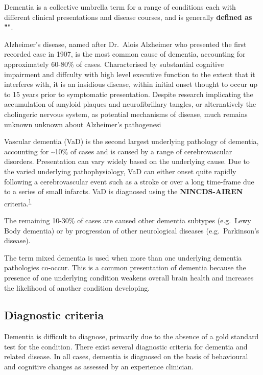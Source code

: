 \documentclass[a4paper, twoside]{templates/ociamthesis}
\begin{document}
Dementia is a collective umbrella term for a range of conditions each with different clinical presentations and disease courses, and is generally \textbf{defined as ""}.

Alzheimer's disease, named after Dr.~Alois Alzheimer who presented the first recorded case in 1907, is the most common cause of dementia, accounting for approximately 60-80\% of cases. Characterised by substantial cognitive impairment and diffculty with high level executive function to the extent that it interferes with, it is an insidious disease, within initial onset thought to occur up to 15 years prior to symptomatic presentation. Despite research implicating the accumulation of amyloid plaques and neurofibrillary tangles, or alternatively the cholingeric nervous system, as potential mechanisms of disease, much remains unknown unknown about Alzheimer's pathogenesi

Vascular dementia (VaD) is the second largest underlying pathology of dementia, accounting for \textasciitilde10\% of cases and is caused by a range of cerebrovascular disorders. Presentation can vary widely based on the underlying cause. Due to the varied underlying pathophysiology, VaD can either onset quite rapidly following a cerebrovascular event such as a stroke or over a long time-frame due to a series of small infarcts. VaD is diagnosed using the \textbf{NINCDS-AIREN} criteria.\textsuperscript{\protect\hyperlink{ref-roman1993vascular}{1}}

The remaining 10-30\% of cases are caused other dementia subtypes (e.g.~Lewy Body dementia) or by progression of other neurological diseases (e.g.~Parkinson's disease).

The term mixed dementia is used when more than one underlying dementia pathologies co-occur. This is a common presentation of dementia because the presence of one underlying condition weakens overall brain health and increases the likelihood of another condition developing.

\hypertarget{diagnostic-criteria}{%
\subsection{Diagnostic criteria}\label{diagnostic-criteria}}

Dementia is difficult to diagnose, primarily due to the absence of a gold standard test for the condition. There exist several diagnostic criteria for dementia and related disease. In all cases, dementia is diagnosed on the basis of behavioural and cognitive changes as assessed by an experience clinician.
\end{document}
